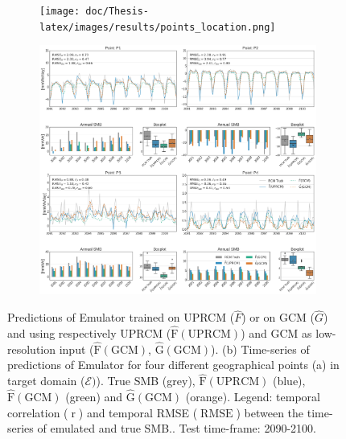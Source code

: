 \documentclass[a4paper,11pt,oneside]{report}
\begin{document}
\begin{figure}[tbp]
        \centering
        \begin{subfigure}[b]{0.2\columnwidth}
            \centering \texttt{[image: doc/Thesis-latex/images/results/points\_location.png]}
            \caption[]%
            {{\small}}    
          \label{fig:points-location}
        \end{subfigure}
        \hfill
        \begin{subfigure}[b]{\columnwidth}  
            \centering 
           \includegraphics[width=\textwidth]{doc/Thesis-latex/images/results/timeseries_RCM_GCM.png}
            \caption[]%
            {{\small }}  
          \label{fig:timeseries-GCM-UPRCM}
        \end{subfigure}
        \hfill
        \caption[]
        {\small Predictions of Emulator trained on UPRCM ($\hat{F}$) or on GCM ($\hat{G}$) and using respectively UPRCM ($\operatorname{\hat{F}(UPRCM)}$) and GCM as low-resolution input ($\operatorname{\hat{F}(GCM)}$, $\operatorname{\hat{G}(GCM)}$). (b) Time-series of predictions of Emulator for four different geographical points (a) in target domain ($\mathcal{E})$). True SMB (grey), $\operatorname{\hat{F}(UPRCM)}$ (blue), $\operatorname{\hat{F}(GCM)}$ (green) and $\operatorname{\hat{G}(GCM)}$ (orange). Legend: temporal correlation ($\operatorname{r}$) and temporal RMSE ($\operatorname{RMSE}$) between the time-series of emulated and true SMB.. Test time-frame: 2090-2100. } 
        \label{fig:points-timeseries-GCM-UPRCM}
    \end{figure}
\end{document}
